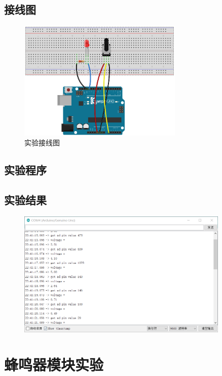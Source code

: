 \documentclass[UTF8, oneside]{ctexbook}
\begin{document}
\section{接线图}
\begin{figure}[h]
    \centering
    \includegraphics[width=0.7\textwidth]{./result/basic/6/lines.png}
    \caption{实验接线图}
    \label{b6_line}
\end{figure}

\section{实验程序}


\section{实验结果}
\begin{figure}[h]
    \centering
    \includegraphics[width=0.9\textwidth]{./result/basic/6/result.png}
\end{figure}

\chapter{蜂鸣器模块实验}
\end{document}
